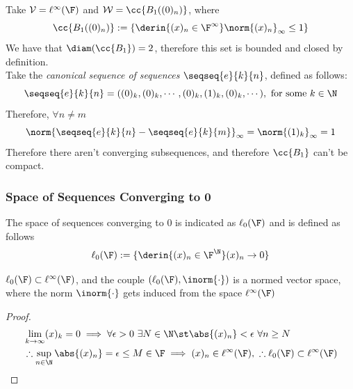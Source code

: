 \documentclass[../mmf.tex]{subfiles}
\begin{document}
\begin{eg}
	Take $\mathcal{V}=\ell^\infty(\F)$ and $\mathcal{W}=\cc{B_1( (0)_n )}$, where $$\cc{B_1( (0)_n )}:=\{\derin{(x)_n\in\F^\infty}\norm{(x)_n}_\infty\le1\}$$
	We have that $\diam(\cc{B_1})=2$, therefore this set is bounded and closed by definition.\\
	Take the \textit{canonical sequence of sequences} $\seqseq{e}{k}{n}$, defined as follows:
	\begin{equation*}
		\seqseq{e}{k}{n}=((0)_k,(0)_k,\cdots,(0)_k,(1)_k,(0)_k,\cdots),\ \text{for some}\ k\in\N
	\end{equation*}
	Therefore, $\forall n\ne m$
	\begin{equation*}
		\norm{\seqseq{e}{k}{n}-\seqseq{e}{k}{m}}_{\infty}=\norm{(1)_k}_\infty=1
	\end{equation*}
	Therefore there aren't converging subsequences, and therefore $\cc{B_1}$ can't be compact.
\end{eg}
\subsubsection{Space of Sequences Converging to 0}
\begin{dfn}
	The space of sequences converging to $0$ is indicated as $\ell_0(\F)$ and is defined as follows
	\begin{equation}
		\ell_0(\F):=\{\derin{(x)_n\in\F^\N}(x)_n\to0\}
		\label{eq:ellnot}
	\end{equation}
\end{dfn}
\begin{prop}
	$\ell_0(\F)\subset\ell^\infty(\F)$, and the couple $(\ell_0(\F),\inorm{\cdot})$ is a normed vector space, where the norm $\inorm{\cdot}$ gets induced from the space $\ell^\infty(\F)$
\end{prop}
\begin{proof}
	\begin{equation*}
		\begin{aligned}
			&\lim_{k\to\infty}(x)_k=0\implies\forall\epsilon>0\ \exists N\in\N\st\abs{(x)_n}<\epsilon\ \forall n\ge N\\
			&\therefore\sup_{n\in\N}\abs{(x)_n}=\epsilon\le M\in\F\implies(x)_n\in\ell^\infty(\F),\ \therefore\ell_0(\F)\subset\ell^\infty(\F)
		\end{aligned}
	\end{equation*}
\end{proof}
\end{document}
